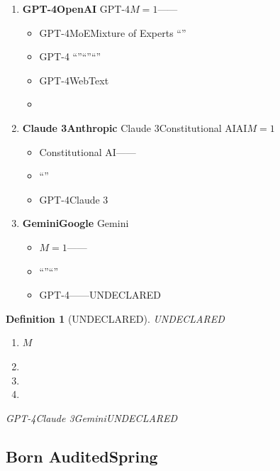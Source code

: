 \documentclass[12pt,a4paper]{article}
\newtheorem{definition}[theorem]{Definition}
\theoremstyle{remark}
\begin{document}
\begin{enumerate}[label=\textbf{ \arabic*},leftmargin=*,itemsep=6pt]
    \item \textbf{GPT-4OpenAI}
    GPT-4$M=1$——
    
    \begin{itemize}[nosep]
        \item \textbf{} GPT-4MoEMixture of Experts
        “”
        
        \item \textbf{} GPT-4
        “”“”“”
        \item \textbf{} GPT-4WebText
        
        \item \textbf{} 
    \end{itemize}
    
    \item \textbf{Claude 3Anthropic}
    Claude 3Constitutional AIAI$M=1$
    \begin{itemize}[nosep]
        \item Constitutional AI\textit{}——
        
        \item “”
        \item GPT-4Claude 3
    \end{itemize}
    
    \item \textbf{GeminiGoogle}
    Gemini
    \begin{itemize}[nosep]
        \item $M=1$——
        
        \item “”“”
        \item GPT-4——UNDECLARED
    \end{itemize}
\end{enumerate}

\begin{definition}[UNDECLARED]\label{def:undeclared}
UNDECLARED
\begin{enumerate}[label=(\roman*),nosep]
    \item $M$
    \item 
    \item 
    \item 
\end{enumerate}
GPT-4Claude 3GeminiUNDECLARED
\end{definition}

\subsection{Born AuditedSpring}
\end{document}
